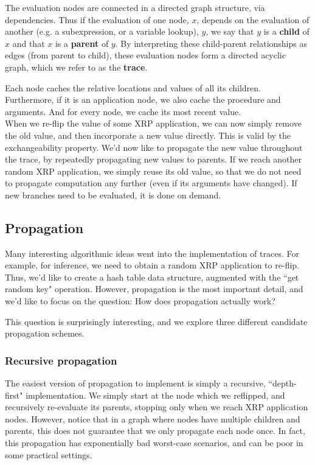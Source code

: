 \documentclass[10pt]{article}
\begin{document}
The evaluation nodes are connected in a directed graph structure, via dependencies.  Thus if the evaluation of one node, $x$, depends on the evaluation of another (e.g. a subexpression, or a variable lookup), $y$, we say that $y$ is a {\bf child} of $x$ and that $x$ is a {\bf parent} of $y$.  By interpreting these child-parent relationships as edges (from parent to child), these evaluation nodes form a directed acyclic graph, which we refer to as the {\bf trace}.  

Each node caches the relative locations and values of all its children.  Furthermore, if it is an application node, we also cache the procedure and arguments.  And for every node, we cache its most recent value.  \\

When we re-flip the value of some XRP application, we can now simply remove the old value, and then incorporate a new value directly.  This is valid by the exchangeability property.  We'd now like to propagate the new value throughout the trace, by repeatedly propagating new values to parents.   If we reach another random XRP application, we simply reuse its old value, so that we do not need to propagate computation any further (even if its arguments have changed).   If new branches need to be evaluated, it is done on demand.  \\

\subsection{Propagation}

Many interesting algorithmic ideas went into the implementation of traces.  For example, for inference, we need to obtain a random XRP application to re-flip.  Thus, we'd like to create a hash table data structure, augmented with the ``get random key" operation.  However, propagation is the most important detail, and we'd like to focus on the question:  How does propagation actually work?  

 This question is surprisingly interesting, and we explore three different candidate propagation schemes.

\subsubsection{Recursive propagation}

The easiest version of propagation to implement is simply a recursive, ``depth-first" implementation.  We simply start at the node which we reflipped, and recursively re-evaluate its parents, stopping only when we reach XRP application nodes.   However, notice that in a graph where nodes have multiple children and parents, this does not guarantee that we only propagate each node once.  In fact, this propagation has exponentially bad worst-case scenarios, and can be poor in some practical settings.  
\end{document}
